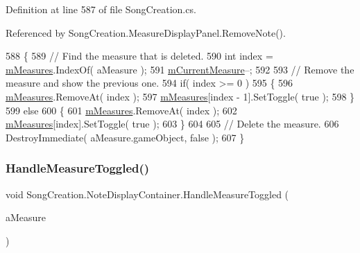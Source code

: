 Definition at line 587 of file Song\+Creation.\+cs.



Referenced by Song\+Creation.\+Measure\+Display\+Panel.\+Remove\+Note().


\begin{DoxyCode}
588         \{
589             \textcolor{comment}{// Find the measure that is deleted.}
590             \textcolor{keywordtype}{int} index = \hyperlink{class_song_creation_1_1_note_display_container_a19c1c32db579c642fbc1b5bce0c80e7a}{mMeasures}.IndexOf( aMeasure );
591             \hyperlink{class_song_creation_1_1_note_display_container_ad63614e1c51c2db44cfc0fc21704c4ff}{mCurrentMeasure}--;
592 
593             \textcolor{comment}{// Remove the measure and show the previous one. }
594             \textcolor{keywordflow}{if}( index >= 0 )
595             \{
596                 \hyperlink{class_song_creation_1_1_note_display_container_a19c1c32db579c642fbc1b5bce0c80e7a}{mMeasures}.RemoveAt( index );
597                 \hyperlink{class_song_creation_1_1_note_display_container_a19c1c32db579c642fbc1b5bce0c80e7a}{mMeasures}[index - 1].SetToggle( \textcolor{keyword}{true} );
598             \}
599             \textcolor{keywordflow}{else}
600             \{
601                 \hyperlink{class_song_creation_1_1_note_display_container_a19c1c32db579c642fbc1b5bce0c80e7a}{mMeasures}.RemoveAt( index );
602                 \hyperlink{class_song_creation_1_1_note_display_container_a19c1c32db579c642fbc1b5bce0c80e7a}{mMeasures}[index].SetToggle( \textcolor{keyword}{true} );
603             \}
604 
605             \textcolor{comment}{// Delete the measure.}
606             DestroyImmediate( aMeasure.gameObject, \textcolor{keyword}{false} );
607         \}
\end{DoxyCode}
\mbox{\label{class_song_creation_1_1_note_display_container_af7f99e611828e62a31947a5a4d474465}} 
\subsubsection{\texorpdfstring{Handle\+Measure\+Toggled()}{HandleMeasureToggled()}}
{\footnotesize\ttfamily void Song\+Creation.\+Note\+Display\+Container.\+Handle\+Measure\+Toggled (\begin{DoxyParamCaption}\item[{\hyperlink{class_song_creation_1_1_measure_display_panel}{Measure\+Display\+Panel}}]{a\+Measure }\end{DoxyParamCaption})}



